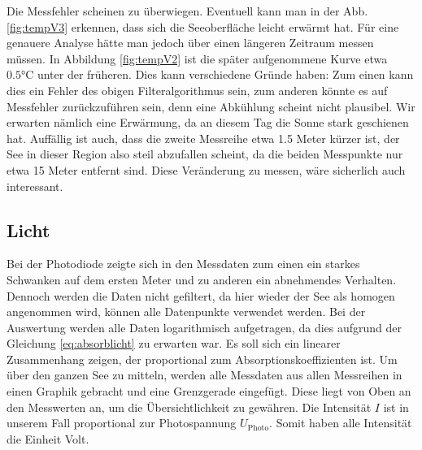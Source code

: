 \documentclass[12pt,a4paper,titlepage,headinclude,bibtotoc]{scrartcl}
\numberwithin{equation}{subsection}
\begin{document}
Die Messfehler scheinen zu überwiegen.
Eventuell kann man in der Abb.\ref{fig:tempV3} erkennen, dass sich die Seeoberfläche leicht erwärmt hat.
Für eine genauere Analyse hätte man jedoch über einen längeren Zeitraum messen müssen.
In Abbildung \ref{fig:tempV2} ist die später aufgenommene Kurve etwa $0.5\si\celsius$ unter der früheren.
Dies kann verschiedene Gründe haben: Zum einen kann dies ein Fehler des obigen Filteralgorithmus sein, zum anderen könnte es auf Messfehler zurückzuführen sein, denn eine Abkühlung scheint nicht plausibel.
Wir erwarten nämlich eine Erwärmung, da an diesem Tag die Sonne stark geschienen hat.
Auffällig ist auch, dass die zweite Messreihe etwa 1.5 Meter kürzer ist, der See in dieser Region also steil abzufallen scheint, da die beiden Messpunkte nur etwa 15 Meter entfernt sind.
Diese Veränderung zu messen, wäre sicherlich auch interessant.

\subsection{Licht}

Bei der Photodiode zeigte sich in den Messdaten zum einen ein starkes Schwanken auf dem ersten Meter und zu anderen ein abnehmendes Verhalten.
Dennoch werden die Daten nicht gefiltert, da hier wieder der See als homogen angenommen wird, können alle Datenpunkte verwendet werden.
Bei der Auswertung werden alle Daten logarithmisch aufgetragen, da dies aufgrund der Gleichung \ref{eq:absorblicht} zu erwarten war. 
Es soll sich ein linearer Zusammenhang zeigen, der proportional zum Absorptionskoeffizienten ist.
Um über den ganzen See zu mitteln, werden alle Messdaten aus allen Messreihen in einen Graphik gebracht und eine Grenzgerade eingefügt.
Diese liegt von Oben an den Messwerten an, um die Übersichtlichkeit zu gewähren.
Die Intensität $I$ ist in unserem Fall proportional zur Photospannung $U_\text{Photo}$.
Somit haben alle Intensität die Einheit Volt.
\end{document}
